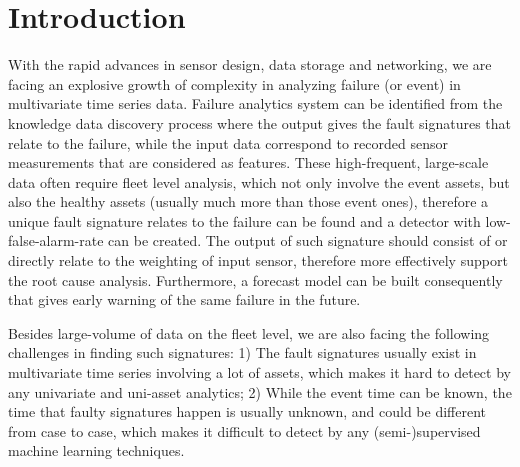 \section{Introduction}
\label{sec:MAMT:intro}

With the rapid advances in sensor design, data storage and networking, we are facing an explosive growth of complexity in analyzing failure (or event) in multivariate time series data. Failure analytics system can be identified from the knowledge data discovery process where the output gives the fault signatures that relate to the failure, while the input data correspond to recorded sensor measurements that are considered as features. These high-frequent, large-scale data often require fleet level analysis, which not only involve the event assets, but also the healthy assets (usually much more than those event ones), therefore a unique fault signature relates to the failure can be found and a detector with low-false-alarm-rate can be created. The output of such signature should consist of or directly relate to the weighting of input sensor, therefore more effectively support the root cause analysis. Furthermore, a forecast model can be built consequently that gives early warning of the same failure in the future.      


Besides large-volume of data on the fleet level, we are also facing the following challenges in finding such signatures: 
1) The fault signatures usually exist in multivariate time series involving a lot of assets, which makes it hard to detect by any univariate and uni-asset analytics;
2) While the event time can be known, the time that faulty signatures happen is usually unknown, and could be different from case to case, which makes it difficult to detect by any (semi-)supervised machine learning techniques. 

